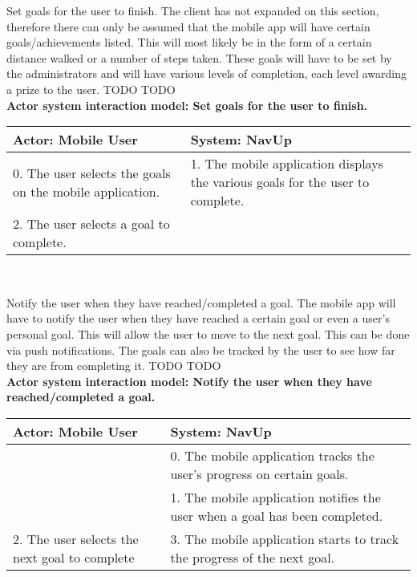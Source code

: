\FuncReq
{Set goals for the user to finish.}
{The client has not expanded on this section, therefore there can only be assumed that the mobile app will have certain goals/achievements listed. This will most likely be in the form of a certain distance walked or a number of steps taken. These goals will have to be set by the administrators and will have various levels of completion, each level awarding a prize to the user.}
{TODO}
{TODO}
\\
\textbf{Actor system interaction model: Set goals for the user to finish.}\\
\begin{tabular}{ | p{6cm} | p{6cm} |}
\hline
Actor: Mobile User & System: NavUp \\ \hline
0. The user selects the goals on the mobile application. & 1. The mobile application displays the various goals for the user to complete.\\ \hline
2. The user selects a goal to complete. &\\ \hline
\end{tabular}
\\
\bigskip

\FuncReq
{Notify the user when they have reached/completed a goal.}
{The mobile app will have to notify the user when they have reached a certain goal or even a user's personal goal. This will allow the user to move to the next goal. This can be done via push notifications. The goals can also be tracked by the user to see how far they are from completing it.}
{TODO}
{TODO}
\\
\textbf{Actor system interaction model: Notify the user when they have reached/completed a goal.}\\
\begin{tabular}{ | p{6cm} | p{6cm} |}
\hline
Actor: Mobile User & System: NavUp \\ \hline
& 0. The mobile application tracks the user's progress on certain goals.\\ \hline
& 1. The mobile application notifies the user when a goal has been completed.\\ \hline
2. The user selects the next goal to complete & 3. The mobile application starts to track the progress of the next goal.\\ \hline
\end{tabular}
\\
\bigskip


